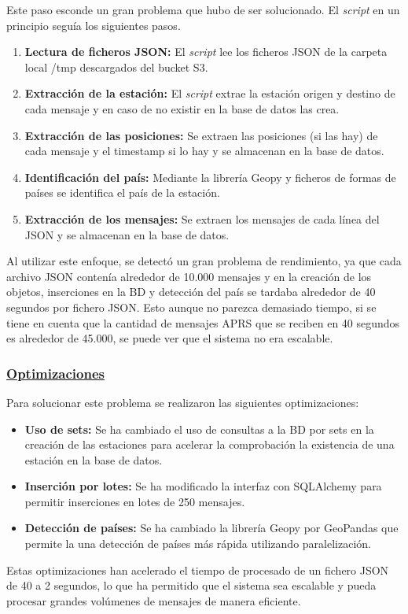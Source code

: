 Este paso esconde un gran problema que hubo de ser solucionado. El \textit{script} en un principio seguía los siguientes pasos.

\begin{enumerate}
	\item \textbf{Lectura de ficheros JSON:} El \textit{script} lee los ficheros JSON de la carpeta local /tmp descargados del bucket S3.
	\item \textbf{Extracción de la estación:} El \textit{script} extrae la estación origen y destino de cada mensaje y en caso de no existir en la base de datos las crea.
	\item \textbf{Extracción de las posiciones:} Se extraen las posiciones (si las hay) de cada mensaje y el timestamp si lo hay y se almacenan en la base de datos.
	\item \textbf{Identificación del país:} Mediante la librería Geopy y ficheros de formas de países se identifica el país de la estación.
	\item \textbf{Extracción de los mensajes:} Se extraen los mensajes de cada línea del JSON y se almacenan en la base de datos.
\end{enumerate}

\noindent Al utilizar este enfoque, se detectó un gran problema de rendimiento, ya que cada archivo JSON contenía alrededor de 10.000 mensajes y en la creación de los objetos, inserciones en la BD y detección del país se tardaba alrededor de 40 segundos por fichero JSON. Esto aunque no parezca demasiado tiempo, si se tiene en cuenta que la cantidad de mensajes APRS que se reciben en 40 segundos es alrededor de 45.000, se puede ver que el sistema no era escalable.

\subsubsection*{\underline{Optimizaciones}}
Para solucionar este problema se realizaron las siguientes optimizaciones:
\begin{itemize}
	\item \textbf{Uso de sets:} Se ha cambiado el uso de consultas a la BD por sets en la creación de las estaciones para acelerar la comprobación la existencia de una estación en la base de datos.
	\item \textbf{Inserción por lotes:} Se ha modificado la interfaz con SQLAlchemy para permitir inserciones en lotes de 250 mensajes.
	\item \textbf{Detección de países:} Se ha cambiado la librería Geopy por GeoPandas que permite la una detección de países más rápida utilizando paralelización.
\end{itemize}
Estas optimizaciones han acelerado el tiempo de procesado de un fichero JSON de 40 a 2 segundos, lo que ha permitido que el sistema sea escalable y pueda procesar grandes volúmenes de mensajes de manera eficiente.

